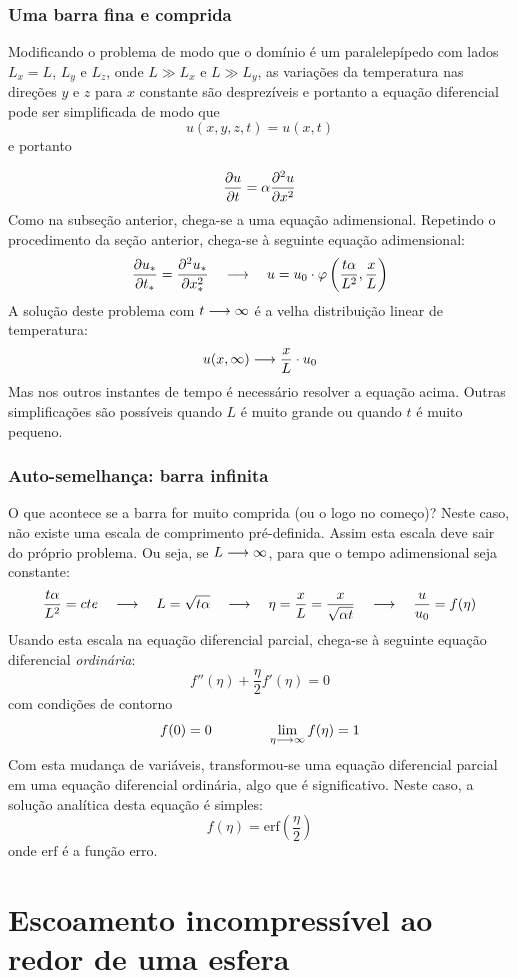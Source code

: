 \subsubsection{Uma barra fina e comprida}

Modificando o problema de modo que o domínio é um paralelepípedo com lados $L_x=L$, $L_y$ e $L_z$, onde $L \gg L_x$ e $L \gg L_y$, as variações da temperatura nas direções $y$ e $z$ para $x$ constante são desprezíveis e portanto a equação diferencial pode ser simplificada de modo que 
\[
u(x, y, z, t) = u(x, t)
\]
e portanto

\[
\frac{\partial u}{\partial t} = \alpha \frac{\partial^2 u}{\partial x^2}
\]
Como na subseção anterior, chega-se a uma equação adimensional. Repetindo o procedimento da seção anterior, chega-se à seguinte equação adimensional:
\[
\frac{\partial u_*}{\partial t_*} = \frac{\partial^2 u_*}{\partial x_*^2} \quad\longrightarrow\quad u = u_0\cdot\varphi\left(\frac{t\alpha}{L^2}, \frac{x}{L}\right)
\]
A solução deste problema com $t\longrightarrow\infty$ é a velha distribuição linear de temperatura:
\[
u(x,\infty) \longrightarrow \frac{x}{L}\cdot u_0
\]
Mas nos outros instantes de tempo é necessário resolver a equação acima. Outras simplificações são possíveis quando $L$ é muito grande ou quando $t$ é muito pequeno.

\subsubsection{Auto-semelhança: barra infinita}
O que acontece se a barra for muito comprida (ou o logo no começo)? Neste caso, não existe uma escala de comprimento pré-definida. Assim esta escala deve sair do próprio problema. Ou seja, se $L\longrightarrow\infty$, para que o tempo adimensional seja constante:
\[
\frac{t\alpha}{L^2} = cte \quad\longrightarrow\quad L = \sqrt{t\alpha} \quad\longrightarrow\quad \eta = \frac{x}{L} = \frac{x}{\sqrt{\alpha t}} \quad\longrightarrow\quad \frac{u}{u_0} = f(\eta)
\]
Usando esta escala na equação diferencial parcial, chega-se à seguinte equação diferencial \emph{ordinária}:
\[
f''(\eta) + \frac{\eta}{2} f'(\eta) = 0
\]
com condições de contorno
\[
f(0) = 0 \qquad\qquad \lim_{\eta\longrightarrow\infty} f(\eta) = 1
\]
Com esta mudança de variáveis, transformou-se uma equação diferencial parcial em uma equação diferencial ordinária, algo que é significativo. Neste caso, a solução analítica desta equação é simples:
\[
f(\eta) = \mathrm{erf}\left(\frac{\eta}{2}\right)
\]
onde $\mathrm{erf}$ é a função erro.

\section{Escoamento incompressível ao redor de uma esfera}


